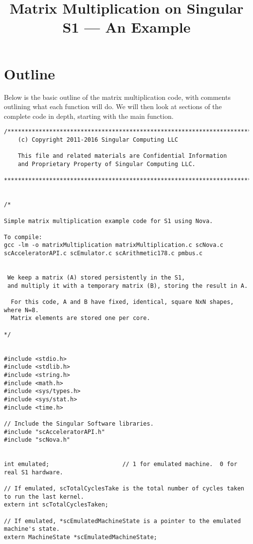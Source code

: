 \documentclass[10pt]{article}
\title{Matrix Multiplication on Singular S1 --- An Example}
\begin{document}
\maketitle

\section{Outline}
Below is the basic outline of the matrix multiplication code, with comments outlining what each function will do.  We will then look at sections of the complete code in depth, starting with the main function.

\begin{verbatim}
/*********************************************************************************
    (c) Copyright 2011-2016 Singular Computing LLC

    This file and related materials are Confidential Information
    and Proprietary Property of Singular Computing LLC.

**********************************************************************************/


/*

Simple matrix multiplication example code for S1 using Nova.

To compile: 
gcc -lm -o matrixMultiplication matrixMultiplication.c scNova.c scAcceleratorAPI.c scEmulator.c scArithmetic178.c pmbus.c


 We keep a matrix (A) stored persistently in the S1,
 and multiply it with a temporary matrix (B), storing the result in A.

  For this code, A and B have fixed, identical, square NxN shapes, where N=8.
  Matrix elements are stored one per core.

*/


#include <stdio.h>
#include <stdlib.h>
#include <string.h>
#include <math.h>
#include <sys/types.h>
#include <sys/stat.h>
#include <time.h>

// Include the Singular Software libraries.
#include "scAcceleratorAPI.h"
#include "scNova.h"


int emulated;                     // 1 for emulated machine.  0 for real S1 hardware.

// If emulated, scTotalCyclesTake is the total number of cycles taken to run the last kernel.
extern int scTotalCyclesTaken;

// If emulated, *scEmulatedMachineState is a pointer to the emulated machine's state.
extern MachineState *scEmulatedMachineState;  


\end{verbatim}
\end{document}

